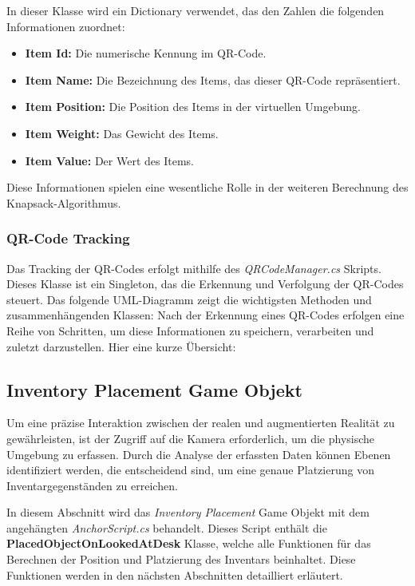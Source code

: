 In dieser Klasse wird ein Dictionary verwendet, das den Zahlen die folgenden Informationen zuordnet:

\begin{itemize}
    \item \textbf{Item Id:} Die numerische Kennung im QR-Code.
    \item \textbf{Item Name:} Die Bezeichnung des Items, das dieser QR-Code repräsentiert.
    \item \textbf{Item Position:} Die Position des Items in der virtuellen Umgebung.
    \item \textbf{Item Weight:} Das Gewicht des Items.
    \item \textbf{Item Value:} Der Wert des Items.
\end{itemize}

Diese Informationen spielen eine wesentliche Rolle in der weiteren Berechnung des Knapsack-Algorithmus.

\subsubsection{QR-Code Tracking}
Das Tracking der QR-Codes erfolgt mithilfe des \textit{QRCodeManager.cs} Skripts. Dieses Klasse ist ein Singleton, das
die Erkennung und Verfolgung der QR-Codes steuert.
Das folgende UML-Diagramm zeigt die wichtigsten Methoden und zusammenhängenden Klassen:
Nach der Erkennung eines QR-Codes erfolgen eine Reihe von Schritten, um diese Informationen zu speichern, verarbeiten
und zuletzt darzustellen.
Hier eine kurze Übersicht:

\subsection{Inventory Placement Game Objekt}
Um eine präzise Interaktion zwischen der realen und augmentierten Realität zu gewährleisten, ist der Zugriff auf die
Kamera erforderlich, um die physische Umgebung zu erfassen. Durch die Analyse der erfassten Daten können Ebenen
identifiziert werden, die entscheidend sind, um eine genaue Platzierung von Inventargegenständen zu erreichen.

In diesem Abschnitt wird das \textit{Inventory Placement} Game Objekt mit dem angehängten \textit{AnchorScript.cs}
behandelt. Dieses Script enthält die \textbf{PlacedObjectOnLookedAtDesk} Klasse, welche alle Funktionen für das Berechnen
der Position und Platzierung des Inventars beinhaltet. Diese Funktionen werden in den nächsten Abschnitten detailliert erläutert.


